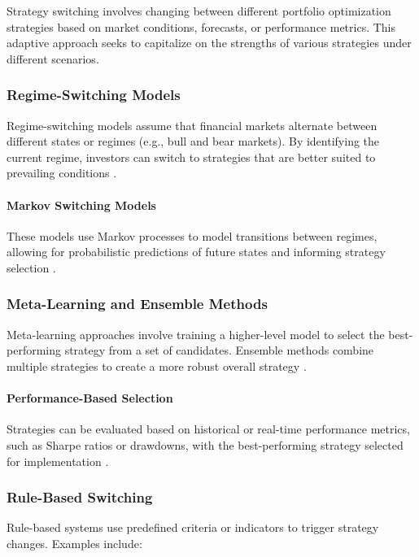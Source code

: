Strategy switching involves changing between different portfolio optimization strategies based on market conditions, forecasts, or performance metrics. This adaptive approach seeks to capitalize on the strengths of various strategies under different scenarios.

\subsubsection{Regime-Switching Models}

Regime-switching models assume that financial markets alternate between different states or regimes (e.g., bull and bear markets). By identifying the current regime, investors can switch to strategies that are better suited to prevailing conditions \cite{ang2002regime}.

\paragraph{Markov Switching Models}

These models use Markov processes to model transitions between regimes, allowing for probabilistic predictions of future states and informing strategy selection \cite{hamilton1989new}.

\subsubsection{Meta-Learning and Ensemble Methods}

Meta-learning approaches involve training a higher-level model to select the best-performing strategy from a set of candidates. Ensemble methods combine multiple strategies to create a more robust overall strategy \cite{huang2019building}.

\paragraph{Performance-Based Selection}

Strategies can be evaluated based on historical or real-time performance metrics, such as Sharpe ratios or drawdowns, with the best-performing strategy selected for implementation \cite{poterba2000portfolio}.

\subsubsection{Rule-Based Switching}

Rule-based systems use predefined criteria or indicators to trigger strategy changes. Examples include:

